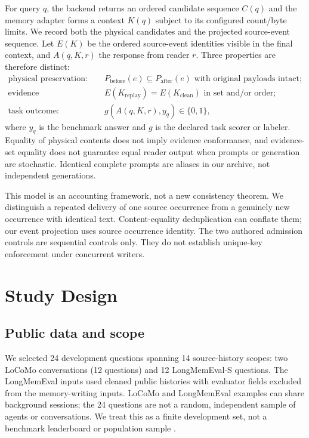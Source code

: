 \documentclass[10pt,letterpaper]{article}
\begin{document}
For query $q$, the backend returns an ordered candidate sequence $C(q)$ and the memory adapter forms a context $K(q)$ subject to its configured count/byte limits. We record both the physical candidates and the projected source-event sequence. Let $E(K)$ be the ordered source-event identities visible in the final context, and $A(q,K,r)$ the response from reader $r$. Three properties are therefore distinct:
\begin{align}
\text{physical preservation:}&\quad P_{\mathrm{before}}(e)\subseteq P_{\mathrm{after}}(e)\text{ with original payloads intact};\\
\text{evidence conformance:}&\quad E(K_{\mathrm{replay}})=E(K_{\mathrm{clean}})\text{ in set and/or order};\\
\text{task outcome:}&\quad g(A(q,K,r), y_q)\in\{0,1\},
\end{align}
where $y_q$ is the benchmark answer and $g$ is the declared task scorer or labeler. Equality of physical contents does not imply evidence conformance, and evidence-set equality does not guarantee equal reader output when prompts or generation are stochastic. Identical complete prompts are aliases in our archive, not independent generations.

This model is an accounting framework, not a new consistency theorem. We distinguish a repeated delivery of one source occurrence from a genuinely new occurrence with identical text. Content-equality deduplication can conflate them; our event projection uses source occurrence identity. The two authored admission controls are sequential controls only. They do not establish unique-key enforcement under concurrent writers.

\section{Study Design}
\subsection{Public data and scope}
We selected 24 development questions spanning 14 source-history scopes: two LoCoMo conversations (12 questions) and 12 LongMemEval-S questions. The LongMemEval inputs used cleaned public histories with evaluator fields excluded from the memory-writing inputs. LoCoMo and LongMemEval examples can share background sessions; the 24 questions are not a random, independent sample of agents or conversations. We treat this as a finite development set, not a benchmark leaderboard or population sample \citep{maharana2024evaluating,wu2024longmemeval}.
\end{document}
